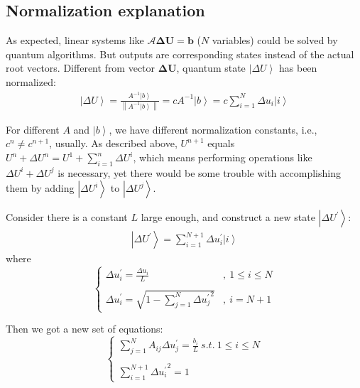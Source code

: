 \documentclass[%
 reprint,
 amsmath,amssymb,
pra,
]{revtex4-1}
\begin{document}
\subsection{Normalization explanation}
As expected, linear systems like $\mathcal{A} \bm{\Delta U} = \bm{b}$ ($N$ variables) could be solved by quantum algorithms. But outputs are corresponding states instead of the actual root vectors. Different from vector $\bm{\Delta U}$, quantum state $\left| \Delta U\right\rangle$ has been normalized: 
\begin{align}
	\left| \Delta U\right\rangle = \frac{A^{-1} \left|b\right\rangle}{\left\|A^{-1} \left|b\right\rangle\right\|} = c A^{-1} \left|b\right\rangle = c \sum_{i=1}^{N} \Delta u_i\left|i\right\rangle
\end{align}

For different $A$ and $\left|b\right\rangle$, we have different normalization constants, i.e., $c^{n} \neq c^{n+1}$, usually. As described above, $U^{n+1}$ equals $U^{n} + \Delta U^{n} = U^{1} + \sum_{i=1}^{n} \Delta U^{i}$, which means performing operations like $\Delta U^{i} + \Delta U^{j}$ is necessary, yet there would be some trouble with accomplishing them by adding $\left|\Delta U^{i}\right\rangle$ to $\left|\Delta U^{j}\right\rangle$.

Consider there is a constant $L$ large enough, and construct a new state $\left|\Delta U^{\prime}\right\rangle$: 
\begin{align}
	\left|\Delta U^{\prime}\right\rangle = \sum_{i=1}^{N+1}\Delta  u_i^{\prime}\left|i\right\rangle
\end{align}
where
\begin{equation}
	\left\{
	\begin{array}{ll}
		\Delta u_i^{\prime} = \frac{\Delta u_i}{L}&,\ 1\leq i \leq N\\
		&\\
		\Delta u_i^{\prime} = \sqrt{1 - \sum_{j=1}^{N}{\Delta u_j^{\prime}}^2}&,\ i=N+1
	\end{array}
	\right.
\end{equation}

Then we got a new set of equations:
\begin{equation}\label{eq:Delta_u_prime_equations}
	\left\{
	\begin{array}{l}
		\sum_{j=1}^{N}A_{ij}\Delta u_j^{\prime} = \frac{b_i}{L} \ s.t. \ 1\leq i \leq N\\
		\\
		\sum_{i=1}^{N + 1}{\Delta u_i^{\prime}}^2 = 1
	\end{array}
	\right.
\end{equation}
\end{document}
